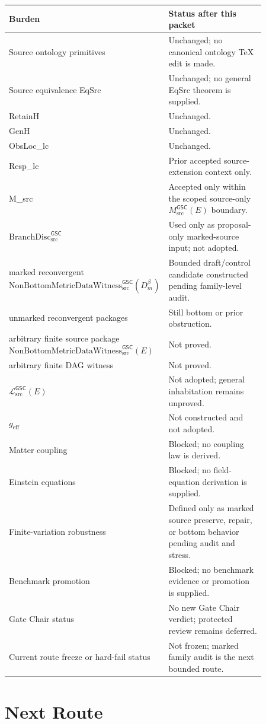 \documentclass[11pt]{article}
\newcommand{\Witness}{\mathrm{NonBottomMetricDataWitness}_{\mathrm{src}}^{\mathsf{GSC}}}
\newcommand{\MetricData}{\mathcal{L}_{\mathrm{src}}^{\mathsf{GSC}}}
\newcommand{\geff}{g_{\mathrm{eff}}}
\newcommand{\BranchDisc}{\mathrm{BranchDisc}_{\mathrm{src}}^{\mathsf{GSC}}}
\newcommand{\Dmbeta}{D_m^{\beta}}
\begin{document}
\begin{longtable}{p{0.30\linewidth}p{0.56\linewidth}}
\toprule
Burden & Status after this packet \\
\midrule
Source ontology primitives & Unchanged; no canonical ontology TeX edit is made. \\
Source equivalence EqSrc & Unchanged; no general EqSrc theorem is supplied. \\
RetainH & Unchanged. \\
GenH & Unchanged. \\
ObsLoc\_lc & Unchanged. \\
Resp\_lc & Prior accepted source-extension context only. \\
M\_src & Accepted only within the scoped source-only \(M_{\mathrm{src}}^{\mathsf{GSC}}(E)\) boundary. \\
\(\BranchDisc\) & Used only as proposal-only marked-source input; not adopted. \\
marked reconvergent \(\Witness(\Dmbeta)\) & Bounded draft/control candidate constructed pending family-level audit. \\
unmarked reconvergent packages & Still bottom or prior obstruction. \\
arbitrary finite source package \(\Witness(E)\) & Not proved. \\
arbitrary finite DAG witness & Not proved. \\
\(\MetricData(E)\) & Not adopted; general inhabitation remains unproved. \\
\(\geff\) & Not constructed and not adopted. \\
Matter coupling & Blocked; no coupling law is derived. \\
Einstein equations & Blocked; no field-equation derivation is supplied. \\
Finite-variation robustness & Defined only as marked source preserve, repair, or bottom behavior pending audit and stress. \\
Benchmark promotion & Blocked; no benchmark evidence or promotion is supplied. \\
Gate Chair status & No new Gate Chair verdict; protected review remains deferred. \\
Current route freeze or hard-fail status & Not frozen; marked family audit is the next bounded route. \\
\bottomrule
\end{longtable}

\section{Next Route}
\end{document}
